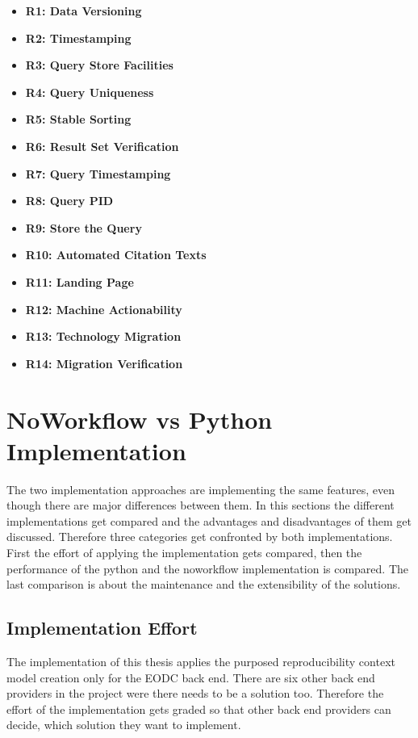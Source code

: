 \documentclass[draft,final]{vutinfth} %
\begin{document}
\begin{itemize}
	\item \textbf{R1: Data Versioning}
	\item \textbf{R2: Timestamping}
	\item \textbf{R3: Query Store Facilities}
	\item \textbf{R4: Query Uniqueness}
	\item \textbf{R5: Stable Sorting}
	\item \textbf{R6: Result Set Verification}
	\item \textbf{R7: Query Timestamping}
	\item \textbf{R8: Query PID}
	\item \textbf{R9: Store the Query}
	\item \textbf{R10: Automated Citation Texts}
	\item \textbf{R11: Landing Page}
	\item \textbf{R12: Machine Actionability}
	\item \textbf{R13: Technology Migration}
	\item \textbf{R14: Migration Verification}
\end{itemize}


\section{NoWorkflow vs Python Implementation}\label{Evaluation:NvsP}
The two implementation approaches are implementing the same features, even though there are major differences between them. In this sections the different implementations get compared and the advantages and disadvantages of them get discussed. Therefore three categories get confronted by both implementations. First the effort of applying the implementation gets compared, then the performance of the python and the noworkflow implementation is compared. The last comparison is about the maintenance and the extensibility of the solutions. 

\subsection{Implementation Effort}\label{NvsP:Implementation Effort}
The implementation of this thesis applies the purposed reproducibility context model creation only for the EODC back end. There are six other back end providers in the project were there needs to be a solution too. Therefore the effort of the implementation gets graded so that other back end providers can decide, which solution they want to implement.
\end{document}

